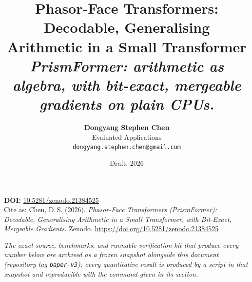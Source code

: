 \documentclass[11pt]{article}
\title{\textbf{Phasor-Face Transformers: Decodable, Generalising Arithmetic in a Small Transformer}\\[0.3em]
\large\normalfont\itshape PrismFormer: arithmetic as algebra, with bit-exact, mergeable gradients on plain CPUs.}
\author{\textbf{Dongyang Stephen Chen}\\ Evaluated Applications\\
\small\texttt{dongyang.stephen.chen@gmail.com}}
\date{Draft, 2026}
\begin{document}
\maketitle

\begin{center}
\textbf{DOI:} \href{https://doi.org/10.5281/zenodo.21384525}{10.5281/zenodo.21384525}\\[0.3em]
\small Cite as: Chen, D.\,S. (2026). \emph{Phasor-Face Transformers (PrismFormer): Decodable,
Generalising Arithmetic in a Small Transformer, with Bit-Exact, Mergeable Gradients.} Zenodo.
\href{https://doi.org/10.5281/zenodo.21384525}{https://doi.org/10.5281/zenodo.21384525}
\end{center}

\begin{center}
\small\itshape
The exact source, benchmarks, and runnable verification kit that produce every number below are
archived as a frozen snapshot alongside this document (repository tag \texttt{paper-v3}); every
quantitative result is produced by a script in that snapshot and reproducible with the command given
in its section.
\end{center}
\end{document}
